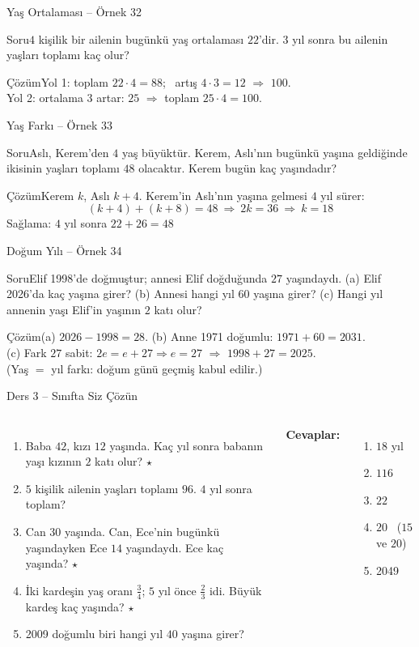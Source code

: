 \documentclass[aspectratio=169,11pt,handout]{beamer}
\newcommand{\soru}[3]{%
\begin{frame}{#1}
  \begin{block}{Soru}\large #2\end{block}
  \pause
  \begin{exampleblock}{Çözüm}\large #3\end{exampleblock}
\end{frame}}
\begin{document}
\soru{Yaş Ortalaması -- Örnek 32}
{\(4\) kişilik bir ailenin bugünkü yaş ortalaması \(22\)'dir. \(3\) yıl sonra bu ailenin yaşları toplamı kaç olur?}
{Yol 1: toplam \(22\cdot 4=88\); \ artış \(4\cdot 3=12\) \(\Rightarrow\) \(100\).\\[4pt]
Yol 2: ortalama \(3\) artar: \(25\) \(\Rightarrow\) toplam \(25\cdot 4=100\).}

\soru{Yaş Farkı -- Örnek 33}
{Aslı, Kerem'den \(4\) yaş büyüktür. Kerem, Aslı'nın bugünkü yaşına geldiğinde ikisinin yaşları toplamı \(48\) olacaktır. Kerem bugün kaç yaşındadır?}
{Kerem \(k\), Aslı \(k+4\). Kerem'in Aslı'nın yaşına gelmesi \(4\) yıl sürer:
\[(k+4)+(k+8)=48\ \Rightarrow\ 2k=36\ \Rightarrow\ k=18\]
Sağlama: \(4\) yıl sonra \(22+26=48\) \checkmark}

\soru{Doğum Yılı -- Örnek 34}
{Elif 1998'de doğmuştur; annesi Elif doğduğunda \(27\) yaşındaydı. (a) Elif 2026'da kaç yaşına girer? (b) Annesi hangi yıl \(60\) yaşına girer? (c) Hangi yıl annenin yaşı Elif'in yaşının \(2\) katı olur?}
{(a) \(2026-1998=28\). \quad (b) Anne 1971 doğumlu: \(1971+60=2031\).\\[3pt]
(c) Fark \(27\) sabit: \(2e=e+27\Rightarrow e=27\) \(\Rightarrow\) \(1998+27=2025\).\\[3pt]
{\normalsize (Yaş \(=\) yıl farkı: doğum günü geçmiş kabul edilir.)}}

\begin{frame}{Ders 3 -- Sınıfta Siz Çözün}
\begin{columns}[t]
\begin{enumerate}
\item Baba \(42\), kızı \(12\) yaşında. Kaç yıl sonra babanın yaşı kızının \(2\) katı olur? \(\star\)
\item \(5\) kişilik ailenin yaşları toplamı \(96\). \(4\) yıl sonra toplam?
\item Can \(30\) yaşında. Can, Ece'nin bugünkü yaşındayken Ece \(14\) yaşındaydı. Ece kaç yaşında? \(\star\)
\item İki kardeşin yaş oranı \(\frac{3}{4}\); \(5\) yıl önce \(\frac{2}{3}\) idi. Büyük kardeş kaç yaşında? \(\star\)
\item 2009 doğumlu biri hangi yıl \(40\) yaşına girer?
\end{enumerate}
\pause
\textbf{Cevaplar:}
\begin{enumerate}
\item \(18\) yıl
\item \(116\)
\item \(22\)
\item \(20\) \ (\(15\) ve \(20\))
\item 2049
\end{enumerate}
\end{columns}
\vspace{4pt}{\footnotesize \(\star\) işaretli soruların adım adım çözümü sonraki slaytlardadır.}
\end{frame}
\end{document}
